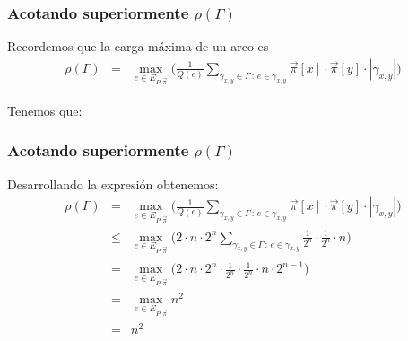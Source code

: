 \documentclass{beamer}
\newcommand{\vs}[1]{\vspace{#1mm}}
\begin{document}
	\begin{frame}
		\frametitle{Acotando superiormente $\rho(\Gamma)$}
		
		{\footnotesize
			Recordemos que la carga máxima de un arco es
			\begin{eqnarray*}
				\rho(\Gamma) & = & \max_{e \in E_{P,\vec \pi}} \bigg(\frac{1}{Q(e)} \sum_{\gamma_{x,y} \in \Gamma \,:\, e \in \gamma_{x,y}} \vec \pi[x] \cdot \vec \pi[y] \cdot |\gamma_{x,y}|\bigg)
			\end{eqnarray*}
			
			\vs{8}
			
			Tenemos que:
			\begin{itemize}
			\end{itemize}
		}
	\end{frame}
	
	\begin{frame}
		\frametitle{Acotando superiormente $\rho(\Gamma)$}
		
		{\small
			Desarrollando la expresión obtenemos:
			\begin{eqnarray*}
				\rho(\Gamma) & = & \max_{e \in E_{P,\vec \pi}} \bigg(\frac{1}{Q(e)} \sum_{\gamma_{x,y} \in \Gamma \,:\, e \in \gamma_{x,y}} \vec \pi[x] \cdot \vec \pi[y] \cdot |\gamma_{x,y}|\bigg)\\
				& \leq &  \max_{e \in E_{P,\vec \pi}} \bigg(2 \cdot n \cdot 2^n \sum_{\gamma_{x,y} \in \Gamma \,:\, e \in \gamma_{x,y}} \frac{1}{2^n} \cdot \frac{1}{2^n} \cdot n\bigg)\\
				& = &  \max_{e \in E_{P,\vec \pi}} \bigg(2 \cdot n \cdot 2^n \cdot \frac{1}{2^n} \cdot \frac{1}{2^n} \cdot n \cdot 2^{n-1} \bigg)\\
				& = &  \max_{e \in E_{P,\vec \pi}} n^2\\
				& = & n^2
			\end{eqnarray*}
		}
	\end{frame}
	
\end{document}
